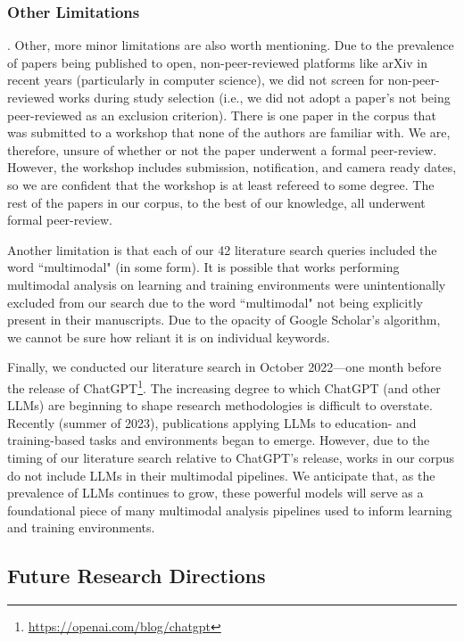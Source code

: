 \documentclass[manuscript,screen,review]{acmart}
\begin{document}
\subsubsection{Other Limitations}.
Other, more minor limitations are also worth mentioning. Due to the prevalence of papers being published to open, non-peer-reviewed platforms like arXiv in recent years (particularly in computer science), we did not screen for non-peer-reviewed works during study selection (i.e., we did not adopt a paper's not being peer-reviewed as an exclusion criterion). There is one paper in the corpus that was submitted to a workshop that none of the authors are familiar with. We are, therefore, unsure of whether or not the paper underwent a formal peer-review. However, the workshop includes submission, notification, and camera ready dates, so we are confident that the workshop is at least refereed to some degree. The rest of the papers in our corpus, to the best of our knowledge, all underwent formal peer-review.

Another limitation is that each of our 42 literature search queries included the word ``multimodal" (in some form). It is possible that works performing multimodal analysis on learning and training environments were unintentionally excluded from our search due to the word ``multimodal" not being explicitly present in their manuscripts. Due to the opacity of Google Scholar's algorithm, we cannot be sure how reliant it is on individual keywords. 

Finally, we conducted our literature search in October 2022---one month before the release of ChatGPT\footnote{\href{https://openai.com/blog/chatgpt}{https://openai.com/blog/chatgpt}}. The increasing degree to which ChatGPT (and other LLMs) are beginning to shape research methodologies is difficult to overstate. Recently (summer of 2023), publications applying LLMs to education- and training-based tasks and environments began to emerge. However, due to the timing of our literature search relative to ChatGPT's release, works in our corpus do not include LLMs in their multimodal pipelines. We anticipate that, as the prevalence of LLMs continues to grow, these powerful models will serve as a foundational piece of many multimodal analysis pipelines used to inform learning and training environments.

\subsection{Future Research Directions} 
\end{document}

